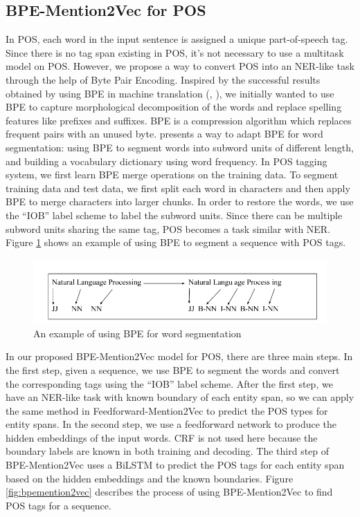 \subsection{BPE-Mention2Vec for POS}
In POS, each word in the input sentence is assigned a unique part-of-speech tag. Since there is no tag span existing in POS, it's not necessary to use a multitask model on POS. However, we propose a way to convert POS into an NER-like task through the help of Byte Pair Encoding. Inspired by the successful results obtained by using BPE in machine translation (\citeauthor{sennrich2015neural}, \citeyear{sennrich2015neural}), we initially wanted to use BPE to capture morphological decomposition of the words and replace spelling features like prefixes and suffixes. BPE is a compression algorithm which replaces frequent pairs with an unused byte. \cite{sennrich2015neural} presents a way to adapt BPE for word segmentation: using BPE to segment words into subword units of different length, and building a vocabulary dictionary using word frequency. In POS tagging system, we first learn BPE merge operations on the training data. To segment training data and test data, we first split each word in characters and then apply BPE to merge characters into larger chunks. In order to restore the words, we use the ``IOB'' label scheme to label the subword units. Since there can be multiple subword units sharing the same tag, POS becomes a task similar with NER. Figure \ref{fig:bpe} shows an example of using BPE to segment a sequence with POS tags. 

\begin{figure}[h]
  \centering
  \includegraphics[scale=0.5]{bpe.png}
 \caption{An example of using BPE for word segmentation}
  \label{fig:bpe}
\end{figure}

In our proposed BPE-Mention2Vec model for POS, there are three main steps. In the first step, given a sequence, we use BPE to segment the words and convert the corresponding tags using the ``IOB'' label scheme. After the first step, we have an NER-like task with known boundary of each entity span, so we can apply the same method in Feedforward-Mention2Vec to predict the POS types for entity spans. In the second step, we use a feedforward network to produce the hidden embeddings of the input words. CRF is not used here because the boundary labels are known in both training and decoding. The third step of BPE-Mention2Vec uses a BiLSTM to predict the POS tags for each entity span based on the hidden embeddings and the known boundaries. Figure \ref{fig:bpemention2vec} describes the process of using BPE-Mention2Vec to find POS tags for a sequence. 

